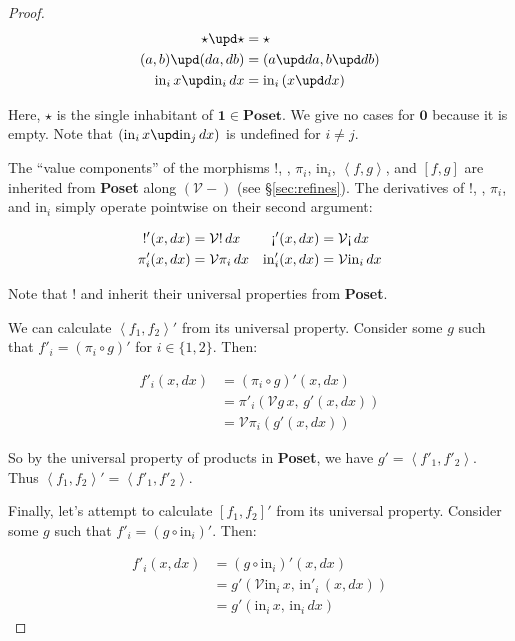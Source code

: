 \documentclass[nomarginums]{rntz}
\newcommand\cat\textbf
\newcommand\Poset{\cat{Poset}}
\newcommand\initO{\ensuremath{\mathbold{0}}}
\newcommand\termO{\ensuremath{\mathbold{1}}}
\newcommand\triv{\star}
\newcommand\injc{\mathrm{in}}
\newcommand\inj[1]{\injc_{#1}\,}
\newcommand\vals[1]{#1^v} %
\newcommand\fork[1]{\langle{#1}\rangle}
\newcommand\Fork[1]{\left\langle{#1}\right\rangle}
\renewcommand\fork\Fork
\renewcommand\vals{\mathcal{V}}
\newcommand\funct[1]{\vals{#1}}
\newcommand\deriv[1]{#1'}
\begin{document}
\begin{proof}
  \begin{align*}
    \triv \upd \triv &= \triv\\
    (a,b) \upd (da,db) &= (a \upd da, b \upd db)\\
    \inj i x \upd \inj i dx &= \inj i (x \upd dx)
  \end{align*}

  \noindent Here, $\triv$ is the single inhabitant of $\termO \in \Poset$. We
  give no cases for $\initO$ because it is empty. Note that $(\inj i x \upd \inj
  j dx)$ is undefined for $i \ne j$.

  The ``value components'' of the morphisms $!$, \textexclamdown, $\pi_i$,
  $\injc_i$, $\fork{f, g}$, and $[f,g]$ are inherited from \Poset{} along
  $(\vals{-})$ (see \S\ref{sec:refines}). The derivatives of $!$, \textexclamdown,
  $\pi_i$, and $\injc_i$ simply operate pointwise on their second argument:

  \begin{align*}
    {\deriv{!}}(x,dx) &= {\funct{!}}\,dx &
    \deriv{\text{\textexclamdown}}(x,dx) &= \funct{\text{\textexclamdown}}\,dx\\
    \deriv\pi_i(x,dx) &= \funct{\pi_i}\,dx &
    \deriv\injc_i(x,dx) &= \funct{\injc_i}\,dx
  \end{align*}

  \noindent
  Note that $!$ and {\textexclamdown} inherit their universal properties from
  \Poset{}.

  We can calculate $\deriv{\fork{f_1,f_2}}$ from its universal property.
  Consider some $g$ such that $\deriv f_i = \deriv{(\pi_i \circ g)}$ for $i \in
  \{1,2\}$. Then:

  \begin{align*}
    \deriv f_i(x,dx)
    &= \deriv{(\pi_i \circ g)}(x,dx)\\
    &= \deriv\pi_i (\funct g\,x,\, \deriv g(x,dx))\\
    &= \funct\pi_i(\deriv g(x,dx))
  \end{align*}

  \noindent
  So by the universal property of products in \Poset{}, we have $g' =
  \fork{\deriv f_1, \deriv f_2}$. Thus $\deriv{\fork{f_1,f_2}} = \fork{\deriv
    f_1, \deriv f_2}$.

  Finally, let's attempt to calculate $\deriv{[f_1,f_2]}$ from its universal
  property. Consider some $g$ such that $\deriv f_i = \deriv{(g \circ
    \injc_i)}$. Then:

  \begin{align*}
    \deriv f_i(x,dx)
    &= \deriv{(g \circ \injc_i)}(x,dx)\\
    &= \deriv g (\funct\injc_i \,x,\, \deriv\injc_i \,(x,dx))\\
    &= \deriv g (\inj i x,\, \inj i dx)
  \end{align*}


\end{proof}
\end{document}
